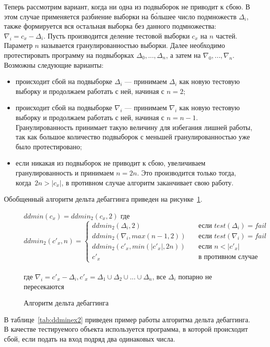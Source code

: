 Теперь рассмотрим вариант, когда ни одна из подвыборок не приводит к сбою. В этом случае применяется разбиение выборки на б\'{о}льшее число подмножеств $\Delta_i$, также формируется вся остальная выборка без данного подмножества: $\nabla_i = c_x - \Delta_i$. Пусть производится деление тестовой выборки $c_x$ на $n$ частей. Параметр $n$ называется гранулированностью выборки. Далее необходимо протестировать программу на подвыборках $\Delta_0,...,\Delta_n$, а затем на $\nabla_0,...,\nabla_n$. Возможны следующие варианты:
%
\begin{itemize}
\item происходит сбой на подвыборке $\Delta_i$ --- принимаем $\Delta_i$ как новую тестовую выборку и продолжаем работать с ней, начиная с $n = 2$;
\item происходит сбой на подвыборке $\nabla_i$ --- принимаем $\nabla_i$ как новую тестовую выборку и продолжаем работать с ней, начиная с $n = n - 1$. Гранулированность принимает такую величину для избегания лишней работы, так как большое количество подвыборок с меньшей гранулированностью уже было протестировано;
\item если никакая из подвыборок не приводит к сбою, увеличиваем гранулированность и принимаем $n = 2n$. Это производится только тогда, когда~$2n > |c_x|$, в противном случае алгоритм заканчивает свою работу.
\end{itemize}
%
Обобщенный алгоритм дельта дебаггинга приведен на рисунке~\ref{ddminalg}.
%
\begin{figure}[H]
	$ddmin(c_x) = ddmin_2(c_x, 2)$ где \\
\[ ddmin_2(c'_x, n) =
  \begin{cases}
    ddmin_2(\Delta_i, 2)       & \quad \text{если } test(\Delta_i) = fail\\
    ddmin_2(\nabla_i, max(n - 1, 2))       & \quad \text{если } test(\nabla_i) = fail\\
    ddmin_2(c'_x, min(|c'_x|, 2n))       & \quad \text{если } n < |c'_x|\\
    c'_x & \quad \text{в противном случае}
  \end{cases}
\]
\\
где $\nabla_i = c'_x - \Delta_i, c'_x = \Delta_1 \cup \Delta_2 \cup ... \cup \Delta_n$, все $\Delta_i$ попарно не пересекаются
\caption{Алгоритм дельта дебаггинга}
\label{ddminalg}
\end{figure}
%
В таблице~\ref{tab:ddminex2} приведен пример работы алгоритма дельта дебаггинга. В качестве тестируемого объекта используется программа, в которой происходит сбой, если подать на вход подряд два одинаковых числа.
